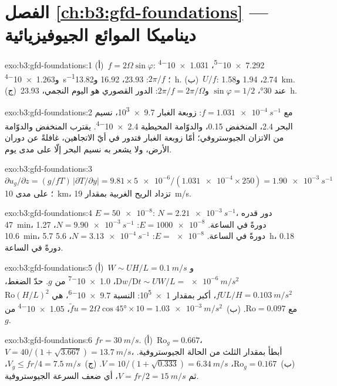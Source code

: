 \section*{الفصل \ref{ch:b3:gfd-foundations} --- ديناميكا الموائع الجيوفيزيائية}

\begin{solution}{exo:b3:gfd-foundations:1}
(أ)~$f = 2\Omega\sin\varphi$: \num{7.292e-5}، \num{1.031e-4}
و\qty{1.263e-4}{s^{-1}}؛ $2\pi/f$: 23.93، 16.92 و\qty{13.82}{h}.
(ب)~$U/f$: 2.74، 1.94 و\qty{1.58}{km}. (ج)~عند \ang{30}، $\sin\varphi =
1/2$ و$2\pi/f = 2\pi/\Omega$: الدور القصوري هو اليوم النجمي،
\qty{23.93}{h}.
\end{solution}

\begin{solution}{exo:b3:gfd-foundations:2}
مع $f = \qty{1.031e-4}{s^{-1}}$: زوبعة الغبار \num{9.7e3}، نسيم البحر 2.4،
المنخفض 0.15، والدوّامة المحيطية \num{2.4e-4}. يقترب المنخفض والدوّامة من
الاتزان الجيوستروفي؛ أمّا زوبعة الغبار فتدور في أيّ الاتجاهين، غافلةً عن
دوران الأرض، ولا يشعر به نسيم البحر إلّا على مدى يوم.
\end{solution}

\begin{solution}{exo:b3:gfd-foundations:3}
$\partial u_g/\partial z = (g/fT)\,|\partial T/\partial y| = 9.81\times
\num{5e-6}/(\num{1.031e-4}\times250) = \qty{1.90e-3}{s^{-1}}$؛ على مدى
\qty{10}{km}، تزداد الريح الغربية بمقدار \qty{19}{m/s}.
\end{solution}

\begin{solution}{exo:b3:gfd-foundations:4}
$E = \num{50e-8}$: $N = \qty{2.21e-3}{s^{-1}}$، دور قدره \qty{47}{min}،
\num{1.27} دورةً في الساعة. $E = \num{1000e-8}$: $N = \qty{9.90e-3}{s^{-1}}$،
\qty{10.6}{min}، 5.7 دورةً في الساعة. $E = \num{e-8}$: $N =
\qty{3.13e-4}{s^{-1}}$، \qty{5.6}{h}، 0.18 دورةً في الساعة.
\end{solution}

\begin{solution}{exo:b3:gfd-foundations:5}
(أ)~$W \sim UH/L = \qty{0.1}{m/s}$ و$\mathrm Dw/\mathrm Dt \sim UW/L =
\qty{e-6}{m/s^2}$، \num{1.0e-7} من $g$. حدّ الضغط، $fUL/H =
\qty{0.103}{m/s^2}$، أكبر بمقدار \num{1e5}: النسبة \num{9.7e-6}، هي
$\mathrm{Ro}(H/L)^2$ مع $\mathrm{Ro} = 0.097$. (ب)~$\tilde fu =
2\Omega\cos\ang{45}\times10 = \qty{1.03e-3}{m/s^2}$، \num{1.05e-4} من $g$.
\end{solution}

\begin{solution}{exo:b3:gfd-foundations:6}
$fr = \qty{30}{m/s}$. (أ)~$\mathrm{Ro}_g = 0.667$، $V = 40/(1 + \sqrt{3.667})
= \qty{13.7}{m/s}$، أبطأ بمقدار الثلث من الحالة الجيوستروفية. (ب)~$\mathrm{Ro}_g =
0.167$، $V = 10/(1 + \sqrt{0.333}) = \qty{6.34}{m/s}$. (ج)~$V_g \le fr/4 =
\qty{7.5}{m/s}$، ثم $V = fr/2 = \qty{15}{m/s}$، أي ضعف
السرعة الجيوستروفية.
\end{solution}

